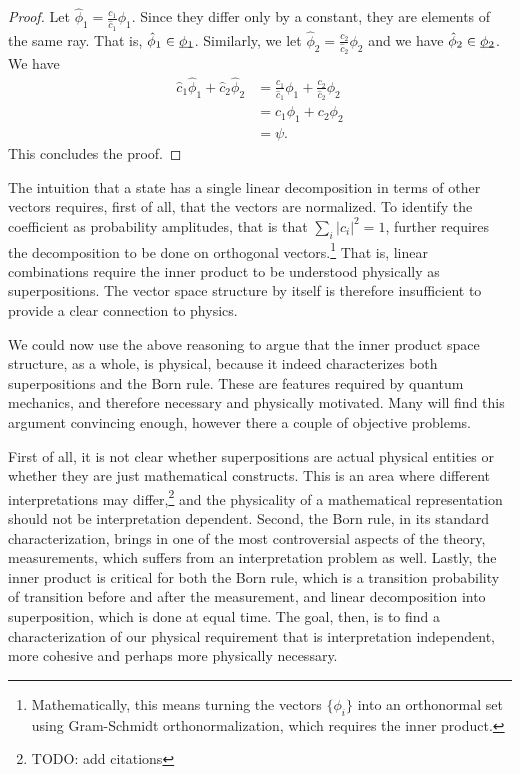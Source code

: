 \documentclass[10pt,twocolumn, nofootinbib]{revtex4-2}
\begin{document}
\begin{proof}
Let $\hat{\phi}_1 = \frac{c_1}{\hat{c}_1} \phi_1$. Since they differ only by a constant, they are elements of the same ray. That is, $\hat{\phi}_1 \in \underbar{$\phi_1$}$. Similarly, we let $\hat{\phi}_2 = \frac{c_2}{\hat{c}_2} \phi_2$ and we have $\hat{\phi}_2 \in \underbar{$\phi_2$}$. We have
\begin{equation}
\begin{aligned}
	\hat{c}_1 \hat{\phi}_1 + \hat{c}_2 \hat{\phi}_2 &= \frac{c_1}{\hat{c}_1} \phi_1 + \frac{c_2}{\hat{c}_2} \phi_2 \\
	&= c_1 \phi_1 + c_2 \phi_2 \\ 
	&= \psi.
	\end{aligned}
\end{equation}
This concludes the proof.
\end{proof}

The intuition that a state has a single linear decomposition in terms of other vectors requires, first of all, that the vectors are normalized. To identify the coefficient as probability amplitudes, that is that $\sum_i |c_i|^2 = 1$, further requires the decomposition to be done on orthogonal vectors.\footnote{Mathematically, this means turning the vectors $\{\phi_i\}$ into an orthonormal set using Gram-Schmidt orthonormalization, which requires the inner product.} That is, linear combinations require the inner product to be understood physically as superpositions. The vector space structure by itself is therefore insufficient to provide a clear connection to physics.

We could now use the above reasoning to argue that the inner product space structure, as a whole, is physical, because it indeed characterizes both superpositions and the Born rule. These are features required by quantum mechanics, and therefore necessary and physically motivated. Many will find this argument convincing enough, however there a couple of objective problems.

First of all, it is not clear whether superpositions are actual physical entities or whether they are just mathematical constructs. This is an area where different interpretations may differ,\footnote{TODO: add citations} and the physicality of a mathematical representation should not be interpretation dependent. Second, the Born rule, in its standard characterization, brings in one of the most controversial aspects of the theory, measurements, which suffers from an interpretation problem as well. Lastly, the inner product is critical for both the Born rule, which is a transition probability of transition before and after the measurement, and linear decomposition into superposition, which is done at equal time. The goal, then, is to find a characterization of our physical requirement that is interpretation independent, more cohesive and perhaps more physically necessary.
\end{document}
